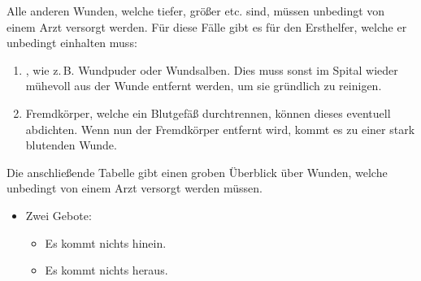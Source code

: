 {
Alle anderen Wunden, welche tiefer, größer etc. sind, müssen unbedingt von
einem Arzt versorgt werden. Für diese Fälle gibt es  für den
Ersthelfer, welche er unbedingt einhalten muss: 

\begin{enumerate}
    \item {}, wie z.\,B. Wundpuder oder Wundsalben. Dies muss sonst im
Spital wieder mühevoll aus der Wunde entfernt werden, um sie
gründlich zu reinigen.
\item {}
Fremdkörper, welche ein Blutgefäß durchtrennen, können dieses eventuell abdichten. Wenn nun der Fremdkörper entfernt wird, kommt es zu einer stark blutenden Wunde. 

\end{enumerate}
 Die anschließende
Tabelle gibt einen groben Überblick über Wunden, welche unbedingt von einem
Arzt versorgt werden müssen.
}{
\begin{itemize}
  \item Zwei Gebote:
  \begin{itemize}
    \item Es kommt nichts hinein.
    \item Es kommt nichts heraus.
  \end{itemize}
\end{itemize}
}{}{}{}

